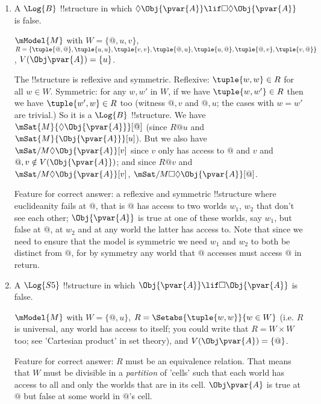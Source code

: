\documentclass[../../../include/open-logic-section]{subfiles}
\begin{document}
\begin{prob}
\begin{ans}
\begin{enumerate}
        \item A $\Log{B}$ !!{structure} in which
        $\Diamond\Obj{\pvar{A}}\lif\Box\Diamond\Obj{\pvar{A}}$ is
        false.

        $\mModel{M}$ with $W=\{@,u,v\}$,
        $R=\{\tuple{@,@},\tuple{u,u},\tuple{v,v},
        \tuple{@,u},\tuple{u,@},\tuple{@,v},\tuple{v,@}
        \}$, $V(\Obj\pvar{A})=\{u\}$.

        The !!{structure} is reflexive and symmetric. Reflexive:
        $\tuple{w,w}\in R$ for all $w\in W$. Symmetric: for any $w,w'$
        in $W$, if we have $\tuple{w,w'}\in R$ then we have
        $\tuple{w',w}\in R$ too (witness $@,v$ and $@,u$; the cases
        with $w=w'$ are trivial.) So it is a $\Log{B}$ !!{structure}.
        We have $\mSat{M}{\Diamond\Obj{\pvar{A}}}[@]$
        (since $R@u$ and $\mSat{M}{\Obj{\pvar{A}}}[u]$). But we also 
        have $\mSat/{M}{\Diamond\Obj{\pvar{A}}}[v]$ since $v$ only 
        has access to $@$ and $v$ and $@,v\notin V(\Obj{\pvar{A}})$;
        and since $R@v$ and $\mSat/{M}{\Diamond\Obj{\pvar{A}}}[v]$,
        $\mSat/{M}{\Box\Diamond\Obj{\pvar{A}}}[@]$.

        Feature for correct answer: a reflexive and symmetric
        !!{structure} where euclideanity fails at $@$, that is $@$ has
        access to two worlds $w_1$, $w_2$ that don't see each other;
        $\Obj{\pvar{A}}$ is true at one of these worlds, say $w_1$,
        but false at $@$, at $w_2$ and at any world the latter has
        access to. Note that since we need to ensure that the model is 
        symmetric we need $w_1$ and $w_2$ to both be distinct from $@$,
        for by symmetry any world that $@$ accesses must access $@$
        in return. 

        \item A $\Log{S5}$ !!{structure} in which
        $\Obj{\pvar{A}}\lif\Box\Obj{\pvar{A}}$ is false.

        $\mModel{M}$ with $W=\{@,u\}$,
        $R=\Setabs{\tuple{w,w}}{w\in W}$ (i.e. $R$ is universal, any 
        world has access to itself; you could write that $R=W\times W$
        too; see 'Cartesian product' in set theory), and 
        $V(\Obj\pvar{A})=\{@\}$.

        Feature for correct answer: $R$ must be an equivalence 
        relation. That means that $W$ must be divisible in a 
        \emph{partition} of 'cells' such that each world has access to all and 
        only the worlds that are in its cell. $\Obj\pvar{A}$ is 
        true at $@$ but false at some world in $@$'s cell. 

    \end{enumerate}
    
    \end{ans}
    
\end{prob}
\end{document}

